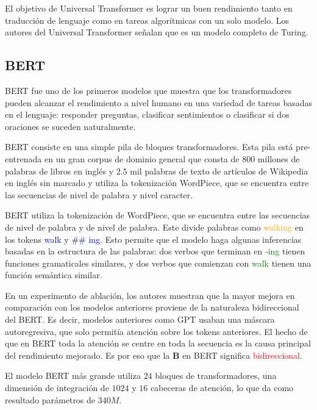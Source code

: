 \documentclass[conference]{IEEEtran}
\begin{document}
El objetivo de Universal Transformer es lograr un buen rendimiento tanto en traducci\'on de lenguaje como en tareas algor\'itmicas con un solo modelo. Los autores del Universal Transformer se\~nalan que es un modelo completo de Turing.


\subsection{BERT}

BERT fue uno de los primeros modelos que muestra que los transformadores pueden alcanzar el rendimiento a nivel humano en una variedad de tareas basadas en el lenguaje: responder preguntas, clasificar sentimientos o clasificar si dos oraciones se suceden naturalmente.

\vspace{0.2cm}

BERT consiste en una simple pila de bloques transformadores. Esta pila est\'a pre-entrenada en un gran corpus de dominio general que consta de $800$ millones de palabras de libros en ingl\'es y $2.5$ mil palabras de texto de art\'iculos de Wikipedia en ingl\'es sin marcado y utiliza la tokenizaci\'on WordPiece, que se encuentra entre las secuencias de nivel de palabra y nivel caracter.


BERT utiliza la tokenizaci\'on de WordPiece, que se encuentra entre las secuencias de nivel de palabra y de nivel de palabra. Este divide palabras como \textcolor{orange}{walking} en los tokens \textcolor{blue}{walk}  y \textcolor{blue}{\#\# ing}. Esto permite que el modelo haga algunas inferencias basadas en la estructura de las palabras: dos verbos que terminan en \textcolor{green}{-ing} tienen funciones gramaticales similares, y dos verbos que comienzan con \textcolor{green}{walk} tienen una funci\'on sem\'antica similar.

\vspace{0.2cm}

En un experimento de ablaci\'on, los autores muestran que la mayor mejora en comparaci\'on con los modelos anteriores proviene de la naturaleza bidireccional del BERT. Es decir, modelos anteriores como GPT usaban una m\'ascara autoregresiva, que solo permit\'ia atenci\'on sobre los tokens anteriores. El hecho de que en BERT toda la atenci\'on se centre en toda la secuencia es la causa principal del rendimiento mejorado. Es por eso que la \textbf{B} en BERT significa \textcolor{red}{bidireccional}.


El modelo BERT m\'as grande utiliza $24$ bloques de transformadores, una dimensi\'on de integraci\'on de $1024$ y $16$ cabeceras de atenci\'on, lo que da como resultado par\'ametros de $340M$.
\end{document}
